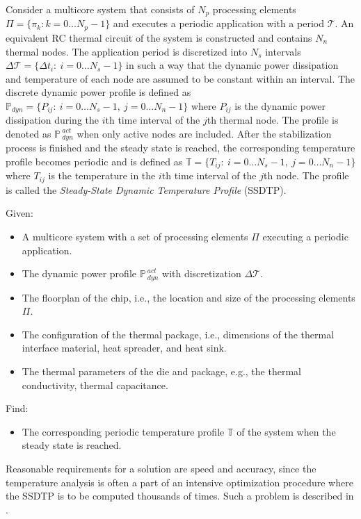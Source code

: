 Consider a multicore system that consists of $N_p$ processing elements $\Pi = \{ \pi_k: k = 0 \dots N_p - 1 \}$ and executes a periodic application with a period $\mathcal{T}$. An equivalent RC thermal circuit of the system is constructed and contains $N_n$ thermal nodes. The application period is discretized into $N_s$ intervals \mbox{$\Delta \mathcal{T} = \{ \Delta t_i: \: i = 0 \dots N_s - 1 \}$} in such a way that the dynamic power dissipation and temperature of each node are assumed to be constant within an interval. The discrete dynamic power profile is defined as \mbox{$\mathbb{P}_{dyn} = \{ P_{ij}: \: i = 0 \dots N_s - 1, \: j = 0 \dots N_n - 1 \}$} where $P_{ij}$ is the dynamic power dissipation during the $i$th time interval of the $j$th thermal node. The profile is denoted as $\mathbb{P}_{\: dyn}^{\:act}$ when only active nodes are included. After the stabilization process is finished and the steady state is reached, the corresponding temperature profile becomes periodic and is defined as \mbox{$\mathbb{T} = \{ T_{ij}: \: i = 0 \dots N_s - 1, \: j = 0 \dots N_n - 1 \}$} where $T_{ij}$ is the temperature in the $i$th time interval of the $j$th node. The profile is called the \emph{Steady-State Dynamic Temperature Profile} (SSDTP).

Given:
\begin{itemize}
  \item A multicore system with a set of processing elements $\Pi$ executing a periodic application.
  \item The dynamic power profile $\mathbb{P}_{\:dyn}^{\:act}$ with discretization $\Delta \mathcal{T}$.
  \item The floorplan of the chip, i.e., the location and size of the processing elements $\Pi$.
  \item The configuration of the thermal package, i.e., dimensions of the thermal interface material, heat spreader, and heat sink.
  \item The thermal parameters of the die and package, e.g., the thermal conductivity, thermal capacitance.
\end{itemize}

Find:
\begin{itemize}
  \item The corresponding periodic temperature profile $\mathbb{T}$ of the system when the steady state is reached.
\end{itemize}

Reasonable requirements for a solution are speed and accuracy, since the temperature analysis is often a part of an intensive optimization procedure where the SSDTP is to be computed thousands of times. Such a problem is described in .
